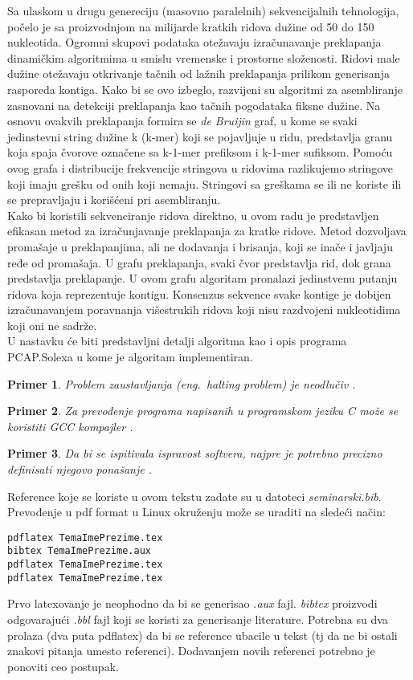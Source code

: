 \documentclass[a4paper]{article}
\newtheorem{primer}{Primer}[section]
\begin{document}
{\indent Sa ulaskom u drugu genereciju (masovno paralelnih) sekvencijalnih tehnologija, počelo je sa proizvodnjom na milijarde kratkih ridova dužine od 50 do 150 nukleotida. Ogromni skupovi podataka otežavaju izračunavanje preklapanja dinamičkim algoritmima u smislu vremenske i prostorne složenosti. Ridovi male dužine otežavaju otkrivanje tačnih od lažnih preklapanja prilikom generisanja rasporeda kontiga. Kako bi se ovo izbeglo, razvijeni su algoritmi za asembliranje zasnovani na detekciji preklapanja kao tačnih pogodataka fiksne dužine. Na osnovu ovakvih preklapanja formira se \textit{de Bruijin} graf, u kome se svaki jedinstevni string dužine k (k-mer) koji se pojavljuje u ridu, predstavlja granu koja spaja čvorove označene sa k-1-mer prefiksom i k-1-mer sufiksom. Pomoću ovog grafa i distribucije frekvencije stringova u ridovima razlikujemo stringove koji imaju grešku od onih koji nemaju. Stringovi sa greškama se ili ne koriste ili se prepravljaju i korišćeni pri asembliranju.  \\
\indent Kako bi koristili sekvenciranje ridova direktno, u ovom radu je predstavljen efikasan metod za izračunjavanje preklapanja za kratke ridove. Metod dozvoljava promašaje u preklapanjima, ali ne dodavanja i brisanja, koji se inače i javljaju ređe od promašaja. U grafu preklapanja, svaki čvor predstavlja rid, dok grana predstavlja preklapanje. U ovom grafu algoritam pronalazi jedinstvenu putanju ridova koja reprezentuje kontigu. Konsenzus sekvence svake kontige je dobijen izračunavanjem poravnanja višestrukih ridova koji nisu razdvojeni nukleotidima koji oni ne sadrže. \\
\indent U nastavku će biti predstavljni detalji algoritma kao i opis programa PCAP.Solexa u kome je algoritam implementiran. 

\begin{primer}
Problem zaustavljanja (eng.~{\em halting problem}) je neodlučiv \cite{haltingproblem}.
\end{primer}

\begin{primer}
Za prevođenje programa napisanih u programskom jeziku C može se koristiti GCC kompajler \cite{gcc}.
\end{primer}

\begin{primer}
 Da bi se ispitivala ispravost softvera, najpre je potrebno precizno definisati njegovo ponašanje \cite{laski2009software}. 
\end{primer}

Reference koje se koriste u ovom tekstu zadate su u datoteci {\em seminarski.bib}. Prevođenje u pdf format u Linux okruženju može se uraditi na sledeći način:
\begin{verbatim}
pdflatex TemaImePrezime.tex 
bibtex TemaImePrezime.aux 
pdflatex TemaImePrezime.tex 
pdflatex TemaImePrezime.tex 
\end{verbatim}
Prvo latexovanje je neophodno da bi se generisao {\em .aux} fajl. {\em bibtex} proizvodi odgovarajući {\em .bbl} fajl koji se koristi za generisanje literature. 
Potrebna su dva prolaza (dva puta pdflatex) da bi se reference ubacile u tekst (tj da ne bi ostali znakovi pitanja umesto referenci). Dodavanjem novih referenci potrebno je ponoviti ceo postupak.  


}
\end{document}
